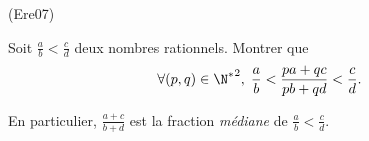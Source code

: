 \begin{tiny}(Ere07)\end{tiny} \label{def:mediane} Soit $\frac{a}{b}<\frac{c}{d}$ deux nombres rationnels. Montrer que
\[
  \forall (p,q) \in {\N^*}^2, \;\frac{a}{b}<\frac{pa+qc}{pb+qd}<\frac{c}{d}.
\]

En particulier, $\frac{a+c}{b+d}$ est la fraction \emph{médiane}  de $\frac{a}{b}<\frac{c}{d}$.
